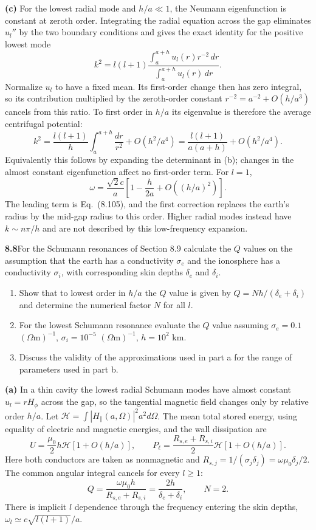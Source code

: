 \textbf{(c)} For the lowest radial mode and $h/a\ll1$, the
Neumann eigenfunction is constant at zeroth order.  Integrating the
radial equation across the gap eliminates $u_l''$ by the two boundary
conditions and gives the exact identity for the positive lowest mode
\[
k^2=l(l+1)\frac{\int_a^{a+h}u_l(r)r^{-2}\,dr}
{\int_a^{a+h}u_l(r)\,dr}.
\]
Normalize $u_l$ to have a fixed mean. Its first-order change then
has zero integral, so its contribution multiplied by the zeroth-order
constant $r^{-2}=a^{-2}+O(h/a^3)$ cancels from this ratio.
To first order in $h/a$ its eigenvalue is therefore the
average centrifugal potential:
\[
k^2=\frac{l(l+1)}h\int_a^{a+h}\frac{dr}{r^2}
+O(h^2/a^4)
=\frac{l(l+1)}{a(a+h)}+O(h^2/a^4).
\]
Equivalently this follows by expanding the determinant in (b);
changes in the almost constant eigenfunction affect no first-order
term.  For $l=1$,
\[
\boxed{\omega=\frac{\sqrt2c}{a}
\left[1-\frac h{2a}+O((h/a)^2)\right].}
\]
The leading term is Eq.~(8.105), and the first correction replaces
the earth's radius by the mid-gap radius to this order.  Higher
radial modes instead have $k\sim n\pi/h$ and are not described by
this low-frequency expansion.

\par\bigskip
\noindent\textbf{8.8}\quad For the Schumann resonances of Section 8.9 calculate the $Q$ values on the assumption that the earth has a conductivity $\sigma_{e}$ and the ionosphere has a conductivity $\sigma_{i}$, with corresponding skin depths $\delta_{e}$ and $\delta_{i}$.
\begin{enumerate}
\item[(a)] Show that to lowest order in $h/a$ the $Q$ value is given by $Q=Nh/(\delta_{e}+\delta_{i})$ and determine the numerical factor $N$ for all $l$.
\item[(b)] For the lowest Schumann resonance evaluate the $Q$ value assuming $\sigma_{e}=0.1$ $(\Omega\mathrm{m})^{-1}$, $\sigma_{i}=10^{-5}$ $(\Omega\mathrm{m})^{-1}$, $h=10^{2}$ km.
\item[(c)] Discuss the validity of the approximations used in part a for the range of parameters used in part b.
\end{enumerate}
\solution

\textbf{(a)} In a thin cavity the lowest radial Schumann modes have
almost constant $u_l=rH_\phi$ across the gap, so the tangential
magnetic field changes only by relative order $h/a$.  Let
$\mathcal H=\int |H_\parallel(a,\Omega)|^2a^2d\Omega$.
The mean total stored energy, using equality of electric and magnetic
energies, and the wall dissipation are
\[
U=\frac{\mu_0}2h\mathcal H[1+O(h/a)],\qquad
P_\ell=\frac{R_{s,e}+R_{s,i}}2\mathcal H[1+O(h/a)].
\]
Here both conductors are taken as nonmagnetic and
$R_{s,j}=1/(\sigma_j\delta_j)=\omega\mu_0\delta_j/2$.
The common angular integral cancels for every $l\geq1$:
\[
\boxed{Q=\frac{\omega\mu_0h}{R_{s,e}+R_{s,i}}
=\frac{2h}{\delta_e+\delta_i},\qquad N=2.}
\]
There is implicit $l$ dependence through the frequency entering the
skin depths, $\omega_l\simeq c\sqrt{l(l+1)}/a$.


